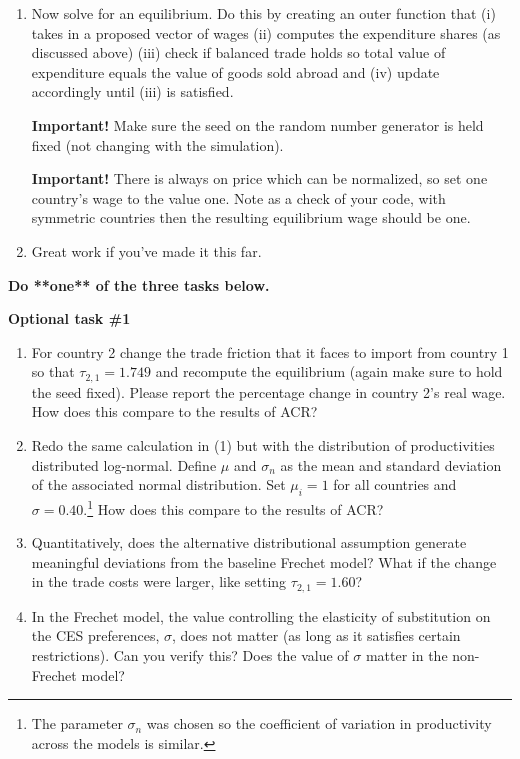 \documentclass[pdftex,11pt]{article}
\begin{document}
\begin{enumerate}
\item Now solve for an equilibrium. Do this by creating an outer function that (i) takes in a proposed vector of wages (ii) computes the expenditure shares (as discussed above) (iii) check if balanced trade holds so total value of expenditure equals the value of goods sold abroad and (iv) update accordingly until (iii) is satisfied.

    \textbf{Important!} Make sure the seed on the random number generator is held fixed (not changing with the simulation).

    \textbf{Important!} There is always on price which can be normalized, so set one country's wage to the value one. Note as a check of your code, with symmetric countries then the resulting equilibrium wage should be one.
    
\item Great work if you've made it this far. 
\end{enumerate}

\bigskip
\bigskip

\centerline{ \Large \textbf{Do **one** of the three tasks below.}}

\bigskip
\bigskip

\centerline{ \large \textbf{Optional task \#1}}
\begin{enumerate}
\item For country 2 change the trade friction that it faces to import from country 1 so that $\tau_{2,1} = 1.749$ and recompute the equilibrium (again make sure to hold the seed fixed). Please report the percentage change in country 2's real wage. How does this compare to the results of ACR?

\item Redo the same calculation in (1) but with the distribution of productivities distributed log-normal. Define $\mu$ and $\sigma_n$ as the mean and standard deviation of the associated normal distribution. Set $\mu_i = 1$ for all countries and $\sigma = 0.40$.\footnote{The parameter $\sigma_n$ was chosen so the coefficient of variation in productivity across the models is similar.} How does this compare to the results of ACR?

\item Quantitatively, does the alternative distributional assumption generate meaningful deviations from the baseline Frechet model? What if the change in the trade costs were larger, like setting $\tau_{2,1} = 1.60$?

\item In the Frechet model, the value controlling the elasticity of substitution on the CES preferences, $\sigma$, does not matter (as long as it satisfies certain restrictions). Can you verify this? Does the value of $\sigma$ matter in the non-Frechet model?
\end{enumerate}
\end{document}
